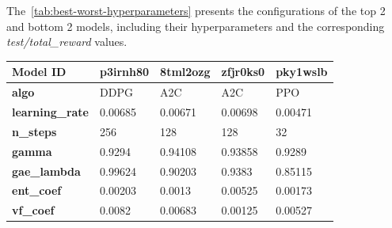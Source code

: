 \documentclass[../xlapes02]{subfiles}
\begin{document}
    The~\cref{tab:best-worst-hyperparameters} presents the configurations of the top 2 and bottom 2 models, including their hyperparameters and the corresponding \emph{test/total\_reward} values.

    \begin{table}[H]
        \centering
        {\footnotesize
            \begin{tabular}{|l||l|l||l|l|}
                \hline
                \textbf{Model ID}                  & p3irnh80                             & 8tml2ozg                             & zfjr0ks0                             & pky1wslb                             \\ \hline
                \textbf{algo}                      & DDPG                                         & A2C                                          & A2C                                          & PPO                                          \\ \hline
                \textbf{learning\_rate}            & 0.00685                                      & 0.00671                                      & 0.00698                                      & 0.00471                                      \\ \hline
                \textbf{n\_steps}                  & 256                                          & 128                                          & 128                                          & 32                                           \\ \hline
                \textbf{gamma}                     & 0.9294                                       & 0.94108                                      & 0.93858                                      & 0.9289                                       \\ \hline
                \textbf{gae\_lambda}               & 0.99624                                      & 0.90203                                      & 0.9383                                       & 0.85115                                      \\ \hline
                \textbf{ent\_coef}                 & 0.00203                                      & 0.0013                                       & 0.00525                                      & 0.00173                                      \\ \hline
                \textbf{vf\_coef}                  & 0.0082                                       & 0.00683                                      & 0.00125                                      & 0.00527                                      \\ \hline

\end{tabular}}
\end{table}
\end{document}

